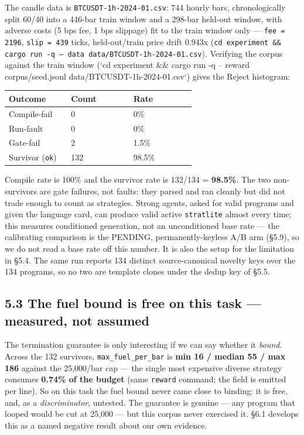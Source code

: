 \documentclass[11pt]{article}
\newcommand{\code}[1]{\texttt{#1}}
\begin{document}
The candle data is \code{BTCUSDT-1h-2024-01.csv}: 744 hourly bars, chronologically
split 60/40 into a 446-bar train window and a 298-bar held-out window, with
adverse costs (5 bps fee, 1 bps slippage) fit to the train window only ---
\code{fee = 2196}, \code{slip = 439} ticks, held-out/train price drift 0.943x
(\code{cd experiment \&\& cargo run -q -- data data/BTCUSDT-1h-2024-01.csv}). Verifying
the corpus against the train window (`cd experiment \&\& cargo run -q -- reward
corpus/seed.jsonl data/BTCUSDT-1h-2024-01.csv`) gives the Reject histogram:

\begingroup\small
\begin{longtable}{p{0.300\linewidth} p{0.300\linewidth} p{0.300\linewidth}}
\toprule
\textbf{Outcome} & \textbf{Count} & \textbf{Rate} \\
\midrule\endhead
Compile-fail & 0 & 0\% \\
Run-fault & 0 & 0\% \\
Gate-fail & 2 & 1.5\% \\
Survivor (\code{ok}) & 132 & 98.5\% \\
\bottomrule
\end{longtable}\endgroup

Compile rate is 100\% and the survivor rate is 132/134 = \textbf{98.5\%}. The two
non-survivors are gate failures, not faults: they parsed and ran cleanly but did
not trade enough to count as strategies. Strong agents, asked for valid programs
and given the language card, can produce valid active \code{stratlite} almost every
time; this measures conditioned generation, not an unconditioned base rate --- the
calibrating comparison is the PENDING, permanently-keyless A/B arm (\S{}5.9), so we
do not read a base rate off this number. It is also the setup for the limitation
in \S{}5.4. The same run reports 134 distinct source-canonical novelty keys over
the 134 programs, so no two are template clones under the dedup key of \S{}5.5.

\subsection*{5.3 The fuel bound is free on this task --- measured, not assumed}

The termination guarantee is only interesting if we can say whether it \emph{bound}.
Across the 132 survivors, \code{max\_fuel\_per\_bar} is \textbf{min 16 / median 55 / max 186}
against the 25,000/bar cap --- the single most expensive diverse strategy consumes
\textbf{0.74\% of the budget} (same \code{reward} command; the field is emitted per line).
So on this task the fuel bound never came close to binding: it is free, and, as
a \emph{discriminator}, untested. The guarantee is genuine --- any program that looped
would be cut at 25,000 --- but this corpus never exercised it. \S{}6.1 develops this
as a named negative result about our own evidence.
\end{document}

